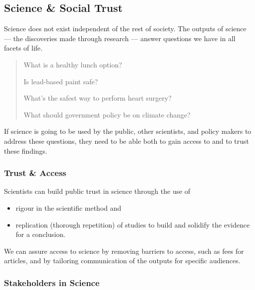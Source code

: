 \documentclass[
]{book}
\providecommand{\tightlist}{%
  \setlength{\itemsep}{0pt}\setlength{\parskip}{0pt}}
\begin{document}
\hypertarget{science-social-trust}{%
\subsection*{Science \& Social Trust}\label{science-social-trust}}

Science does not exist independent of the rest of society. The outputs of science --- the discoveries made through research --- answer questions we have in all facets of life.

\begin{quote}
What is a healthy lunch option?

Is lead-based paint safe?

What's the safest way to perform heart surgery?

What should government policy be on climate change?
\end{quote}

If science is going to be used by the public, other scientists, and policy makers to address these questions, they need to be able both to gain access to and to trust these findings.

\hypertarget{trust-access}{%
\subsubsection*{Trust \& Access}\label{trust-access}}

Scientists can build public trust in science through the use of

\begin{itemize}
\tightlist
\item
  rigour in the scientific method and
\item
  replication (thorough repetition) of studies to build and solidify the evidence for a conclusion.
\end{itemize}

We can assure access to science by removing barriers to access, such as fees for articles, and by tailoring communication of the outputs for specific audiences.

\hypertarget{stakeholders-in-science}{%
\subsubsection*{Stakeholders in Science}\label{stakeholders-in-science}}
\end{document}
